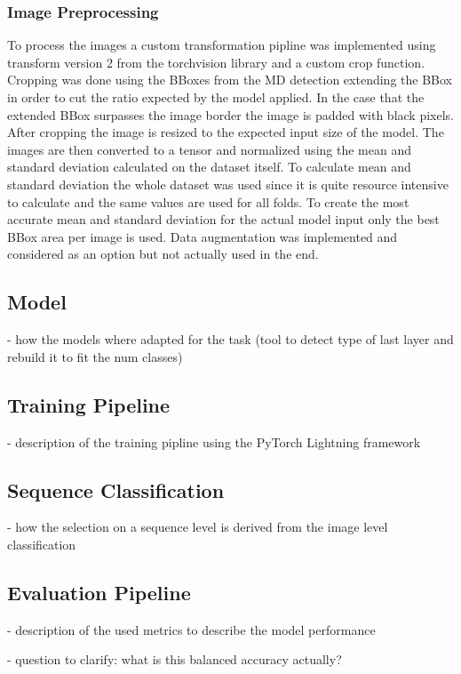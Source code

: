         \subsubsection{Image Preprocessing}
        To process the images a custom transformation pipline was implemented using transform version 2 from the torchvision library and a custom crop function.
        Cropping was done using the BBoxes from the MD detection extending the BBox in order to cut the ratio expected by the model applied.
        In the case that the extended BBox surpasses the image border the image is padded with black pixels.
        After cropping the image is resized to the expected input size of the model.
        The images are then converted to a tensor and normalized using the mean and standard deviation calculated on the dataset itself.
        To calculate mean and standard deviation the whole dataset was used since it is quite resource intensive to calculate and the same values are used for all folds.
        To create the most accurate mean and standard deviation for the actual model input only the best BBox area per image is used.
        Data augmentation was implemented and considered as an option but not actually used in the end.

    \subsection{Model}
    - how the models where adapted for the task (tool to detect type of last layer and rebuild it to fit the num classes)

    \subsection{Training Pipeline}
    - description of the training pipline using the PyTorch Lightning framework

    \subsection{Sequence Classification}
    - how the selection on a sequence level is derived from the image level classification

    \subsection{Evaluation Pipeline}
    - description of the used metrics to describe the model performance

    - question to clarify: what is this balanced accuracy actually?
